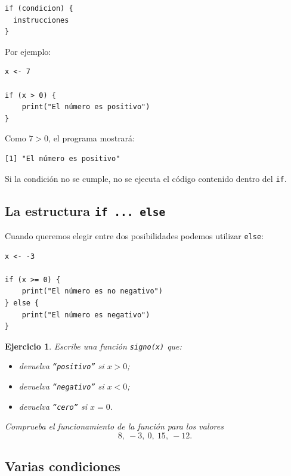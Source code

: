 \documentclass[11pt,a4paper]{article}
\theoremstyle{exercise}
\newtheorem{exercise}{Ejercicio}
\begin{document}
\begin{lstlisting}[style=rstyle]
if (condicion) {
  instrucciones
}
\end{lstlisting}

\noindent Por ejemplo:

\begin{lstlisting}[style=rstyle]
x <- 7

if (x > 0) {
	print("El número es positivo")
}
\end{lstlisting}

\noindent Como $7>0$, el programa mostrará:

\begin{lstlisting}[style=routput]
[1] "El número es positivo"
\end{lstlisting}

\noindent Si la condición no se cumple, no se ejecuta el código contenido dentro del \texttt{if}.

\subsection{La estructura \texttt{if ... else}}

Cuando queremos elegir entre dos posibilidades podemos utilizar \texttt{else}:

\begin{lstlisting}[style=rstyle]
x <- -3

if (x >= 0) {
	print("El número es no negativo")
} else {
	print("El número es negativo")
}
\end{lstlisting}

\begin{exercise} Escribe una función \texttt{signo(x)} que:

\begin{itemize}[leftmargin=*]
  \item devuelva \texttt{``positivo''} si $x>0$;
  \item devuelva \texttt{``negativo''} si $x<0$;
  \item devuelva \texttt{``cero''} si $x=0$.
\end{itemize}

\noindent Comprueba el funcionamiento de la función para los valores
\[
8,\ -3,\ 0,\ 15,\ -12.
\]
\end{exercise}

\subsection{Varias condiciones}
\end{document}

